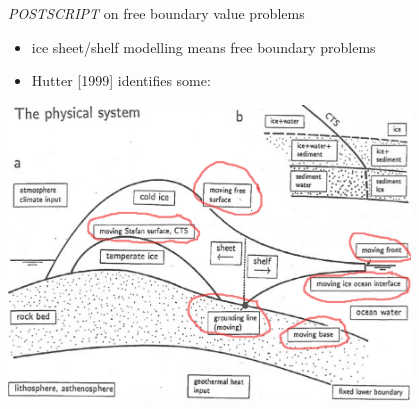 

\begin{frame}{\emph{POSTSCRIPT} on free boundary value problems}

\begin{itemize}
\item ice sheet/shelf modelling means free boundary problems
\item Hutter [1999] identifies some:
\end{itemize}
\begin{center}
  \includegraphics[width=0.8\textwidth]{photos/freehutter}
\end{center}
\end{frame}


